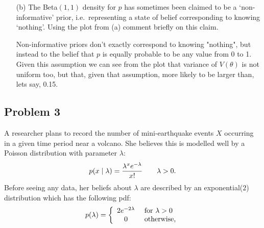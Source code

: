 \documentclass{article}
\newcommand{\1}{\mathbf{1}}
\begin{document}
\begin{enumerate}
    \item[(b)] The Beta$(1,1)$ density for $p$ has sometimes been claimed to be a `non-informative' prior, i.e.~representing a state of belief corresponding to knowing `nothing'. Using the plot from (a) comment briefly on this claim. 
    
    Non-informative priors don't exactly correspond to knowing "nothing", but instead to the belief that $p$ is equally probable to be any value from 0 to 1. Given this assumption we can see from the plot that variance of $V(\theta)$ is not uniform too, but that, given that assumption, more likely to be larger than, lets say, 0.15. 
\end{enumerate}



\newpage
\subsection*{Problem 3} 
A researcher plans to record the number of mini-earthquake events $X$ occurring in a given time period near a volcano. She believes this is modelled well by a Poisson distribution with parameter $\lambda$:
    $$p(x \mid \lambda) = {{\lambda^x e^{-\lambda}}\over {x!}}\quad\quad \lambda > 0.$$
Before seeing any data, her beliefs about $\lambda$ are described by an exponential($2$) distribution which has the following pdf: 
    $$p(\lambda) = \left\{ \begin{array}{cl}
        2 e^{-2\lambda}  & \hbox{ for } \lambda > 0\\
        0 &\hbox{ otherwise,}
    \end{array}
    \right.
    $$
\end{document}
